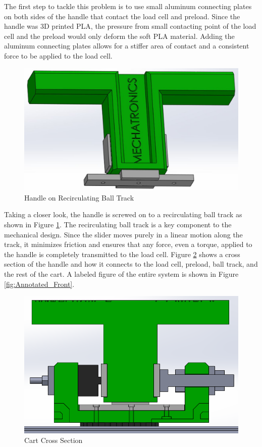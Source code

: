 The first step to tackle this problem is to use small aluminum connecting plates on both sides of the handle that contact the load cell and preload. Since the handle was 3D printed PLA, the pressure from small contacting point of the load cell and the preload would only deform the soft PLA material. Adding the aluminum connecting plates allows for a stiffer area of contact and a consistent force to be applied to the load cell.

\begin{figure}[h]
	\centering
	\includegraphics[width=0.8\columnwidth]{Images/Recirculating_Ball_Track}
	\caption{Handle on Recirculating Ball Track}
	\label{fig:Recirculating_Ball_Track}
\end{figure}

Taking a closer look, the handle is screwed on to a recirculating ball track as shown in Figure \ref{fig:Recirculating_Ball_Track}. The recirculating ball track is a key component to the mechanical design. Since the slider moves purely in a linear motion along the track, it minimizes friction and ensures that any force, even a torque, applied to the handle is completely transmitted to the load cell. Figure \ref{fig:Ball_Track_Cross_Section} shows a cross section of the handle and how it connects to the load cell, preload, ball track, and the rest of the cart. A labeled figure of the entire system is shown in Figure \ref{fig:Annotated_Front}.


\begin{figure}[h]
\centering
\includegraphics[width=0.8\columnwidth]{Images/Ball_Track_Cross_Section}
\caption{Cart Cross Section}
\label{fig:Ball_Track_Cross_Section}
\end{figure}

